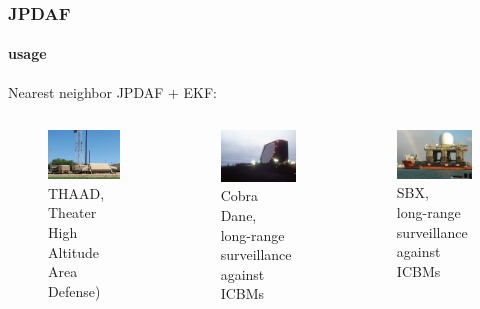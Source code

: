 \begin{frame}
\frametitle{JPDAF}
\framesubtitle{usage}
\logoCSIPCPL\mypagenum
	Nearest neighbor JPDAF + EKF:
	\begin{columns}
		\begin{column}{1.0in}
			\begin{figure}
			{
				\includegraphics[width=1.0in]{figs/TRK_JPDAF_example_THAAD.jpg}
				\caption {THAAD, \\Theater High Altitude Area Defense)}
			}
			\end{figure}
		\end{column}
		\begin{column}{1.0in}
			\begin{figure}
			{
				\includegraphics[width=1.0in]{figs/TRK_JPDAF_example_Cobra.jpg}
				\caption {Cobra Dane,\\long-range surveillance against ICBMs}
			}
			\end{figure}
		\end{column}
		\begin{column}{1.0in}
			\begin{figure}
			{
				\includegraphics[width=1.0in]{figs/TRK_JPDAF_example_SBX.jpg}
				\caption {SBX,\\long-range surveillance against ICBMs}
			}
			\end{figure}
		\end{column}
	\end{columns}
\end{frame}



